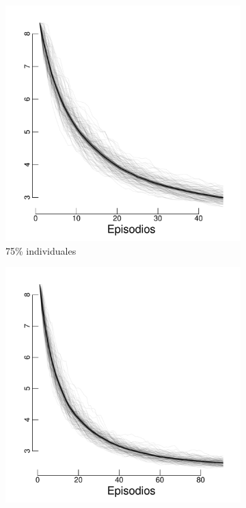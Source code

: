 \documentclass[a4paper,11pt]{book}
\theoremstyle{definition}
\begin{document}
\begin{figure}[H]
\centering
  \begin{subfigure}[t]{0.32\textwidth}
  \includegraphics[page=3,width=\textwidth]{static/truesynergy/expH4.pdf}
  \caption{\scriptsize 75\% individuales}\label{H4_mu}
  \end{subfigure}
  \begin{subfigure}[t]{0.32\textwidth}
  \includegraphics[page=3,width=\textwidth]{static/truesynergy/expH1.pdf}

\end{subfigure}
\end{figure}
\end{document}
